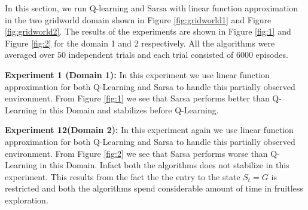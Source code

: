 In this section, we run Q-learning and Sarsa with linear function approximation in the two gridworld domain shown in Figure \ref{fig:gridworld1} and Figure \ref{fig:gridworld2}. The results of the experiments are shown in Figure \ref{fig:1} and Figure \ref{fig:2} for the domain 1 and 2 respectively. All the algorithms were averaged over $50$ independent trials and each trial consisted of $6000$ episodes.

\textbf{Experiment 1 (Domain 1):} In this experiment we use linear function approximation for both Q-Learning and Sarsa to handle this partially observed environment. From Figure \ref{fig:1} we see that Sarsa performs better than Q-Learning in this Domain and stabilizes before Q-Learning.

\textbf{Experiment 12(Domain 2):} In this experiment again we use linear function approximation for both Q-Learning and Sarsa to handle this partially observed environment. From Figure \ref{fig:2} we see that Sarsa performs worse than Q-Learning in this Domain. Infact both the algorithms does not stabilize in this experiment. This results from the fact the the entry to the state $S_t = G$ is restricted and both the algorithms spend considerable amount of time in fruitless exploration.


